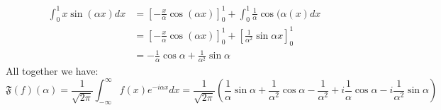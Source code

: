 \documentclass[11pt]{article}
\begin{document}
\begin{solution}
    $$\begin{aligned} \int_0^1 x \sin (\alpha x) d x & =\left[-\frac{x}{\alpha} \cos (\alpha x)\right]_0^1+\int_0^1 \frac{1}{\alpha} \cos (\alpha(x) d x \\ & =\left[-\frac{x}{\alpha} \cos (\alpha x)\right]_0^1+\left[\frac{1}{\alpha^2} \sin \alpha x\right]_0^1 \\ & =-\frac{1}{\alpha} \cos \alpha+\frac{1}{\alpha^2} \sin \alpha\end{aligned}$$
    All together we have:
    $$
        \mathfrak{F}(f)(\alpha)=\frac{1}{\sqrt{2 \pi}} \int_{-\infty}^{\infty} f(x) e^{-i \alpha x} d x = \frac{1}{\sqrt{2\pi}}\left(\frac{1}{\alpha} \sin \alpha+\frac{1}{\alpha^2} \cos \alpha-\frac{1}{\alpha^2} +i\frac{1}{\alpha} \cos \alpha-i\frac{1}{\alpha^2} \sin \alpha\right)
    $$
\end{solution}
\end{document}
